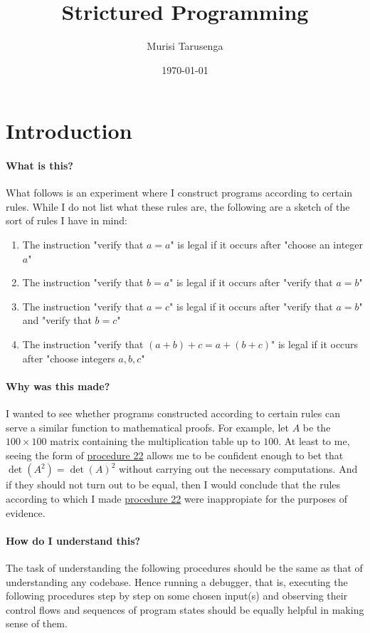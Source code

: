 \documentclass[twocolumn]{article}
\begin{document}
	\title{Strictured Programming}
	\author{Murisi Tarusenga}
	\date{\today{} \currenttime}
	\maketitle
	\section{Introduction}
		\paragraph{What is this?}
			What follows is an experiment where I construct programs according to certain rules. While I do not list what these rules are, the following are a sketch of the sort of rules I have in mind:
			\begin{enumerate}
				\item The instruction "verify that $a=a$" is legal if it occurs after "choose an integer $a$"
				\item The instruction "verify that $b=a$" is legal if it occurs after "verify that $a=b$"
				\item The instruction "verify that $a=c$" is legal if it occurs after "verify that $a=b$" and "verify that $b=c$"
				\item The instruction "verify that $(a+b)+c=a+(b+c)$" is legal if it occurs after "choose integers $a,b,c$"
			\end{enumerate}
		\paragraph{Why was this made?}
			I wanted to see whether programs constructed according to certain rules can serve a similar function to mathematical proofs. For example, let $A$ be the $100\times 100$ matrix containing the multiplication table up to $100$. At least to me, seeing the form of \hyperref[sec:procedure 22]{procedure 22} allows me to be confident enough to bet that $\det(A^2)=\det(A)^2$ without carrying out the necessary computations. And if they should not turn out to be equal, then I would conclude that the rules according to which I made \hyperref[sec:procedure 2]{procedure 22} were inappropiate for the purposes of evidence.
		
		\paragraph{How do I understand this?}
			The task of understanding the following procedures should be the same as that of understanding any codebase. Hence running a debugger, that is, executing the following procedures step by step on some chosen input(s) and observing their control flows and sequences of program states should be equally helpful in making sense of them.
	\tableofcontents
\end{document}
